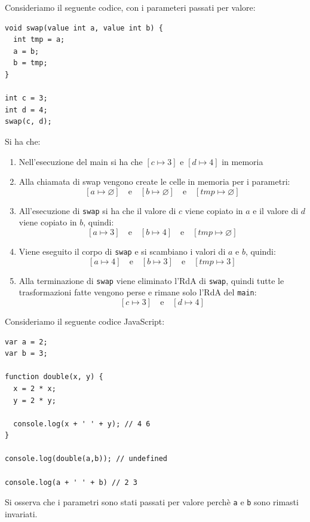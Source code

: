 \documentclass[a4paper]{article}
\begin{document}
\begin{example}
  Consideriamo il seguente codice, con i parameteri passati per valore:
\begin{lstlisting}
void swap(value int a, value int b) {
  int tmp = a;
  a = b;
  b = tmp;
}

int c = 3;
int d = 4;
swap(c, d);
\end{lstlisting}
  Si ha che:
  \begin{enumerate}
    \item Nell'esecuzione del main si ha che \( \left[ c \mapsto 3 \right] \) e
      \( \left[ d \mapsto 4 \right] \) in memoria

    \item Alla chiamata di swap vengono create le celle in memoria per i parametri:
      \[
        \left[ a \mapsto \varnothing \right] \quad \text{e} \quad
        \left[ b \mapsto \varnothing \right] \quad \text{e} \quad
        \left[ tmp \mapsto \varnothing \right]
      \]

    \item All'esecuzione di \texttt{swap} si ha che il valore di \( c \) viene copiato in \( a \)
      e il valore di \( d \) viene copiato in \( b \), quindi:
      \[
        \left[ a \mapsto 3 \right] \quad \text{e} \quad
        \left[ b \mapsto 4 \right] \quad \text{e} \quad
        \left[ tmp \mapsto \varnothing \right]
      \] 

    \item Viene eseguito il corpo di \texttt{swap} e si scambiano i valori di \( a \) e \( b \), quindi:
      \[
        \left[ a \mapsto 4 \right] \quad \text{e} \quad
        \left[ b \mapsto 3 \right] \quad \text{e} \quad
        \left[ tmp \mapsto 3 \right]
      \]

    \item Alla terminazione di \texttt{swap} viene eliminato l'RdA di \texttt{swap},
      quindi tutte le trasformazioni fatte vengono perse e rimane solo l'RdA del 
      \texttt{main}:
      \[
        \left[ c \mapsto 3 \right] \quad \text{e} \quad
        \left[ d \mapsto 4 \right]
      \] 
  \end{enumerate}
\end{example}

\begin{example}
  Consideriamo il seguente codice JavaScript:
\begin{lstlisting}
var a = 2;
var b = 3;

function double(x, y) {
  x = 2 * x;
  y = 2 * y;

  console.log(x + ' ' + y); // 4 6
}

console.log(double(a,b)); // undefined

console.log(a + ' ' + b) // 2 3 
\end{lstlisting}
  Si osserva che i parametri sono stati passati per valore perchè \texttt{a} e \texttt{b}
  sono rimasti invariati.
\end{example}
\end{document}
